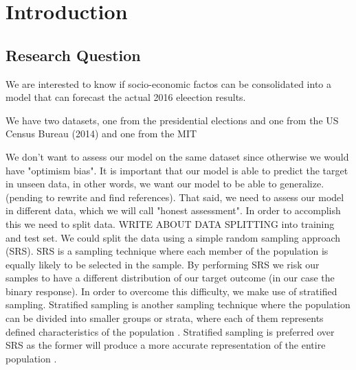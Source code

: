
\chapter{Introduction} %

\label{Chapter1} %


\newcommand{\keyword}[1]{\textbf{#1}}
\newcommand{\tabhead}[1]{\textbf{#1}}
\newcommand{\code}[1]{\texttt{#1}}
\newcommand{\file}[1]{\texttt{\bfseries#1}}
\newcommand{\option}[1]{\texttt{\itshape#1}}


\section{Research Question}
We are interested to know if socio-economic factos can be consolidated into a model that can forecast the actual 2016 eleection results.

We have two datasets, one from the presidential elections and one from the US Census Bureau (2014) and one from the MIT \cite{MIT}


We don't want to assess our model on the same dataset since otherwise we would have "optimism bias". It is important that our model is able to predict the target in unseen data, in other words, we want our model to be able to generalize. (pending to rewrite and find references).  That said, we need to assess our model in different data, which we will call "honest assessment". In order to accomplish this we need to split data. WRITE ABOUT DATA SPLITTING into training and test set.  We could split the data using a simple random sampling approach (SRS). SRS is a sampling technique where each member of the population is equally likely to be selected in the sample. By performing SRS we risk our samples to have a different distribution of our target outcome (in our case the binary response). In order to overcome this difficulty, we make use of stratified sampling. Stratified sampling is another sampling technique where the population can be divided into smaller groups or strata, where each of them represents defined characteristics of the population \parencite{Gelman2002} \parencite{Thompson2012}. Stratified sampling is preferred over SRS as the former will produce a more accurate representation of the entire population \parencite{Meng2013}.

